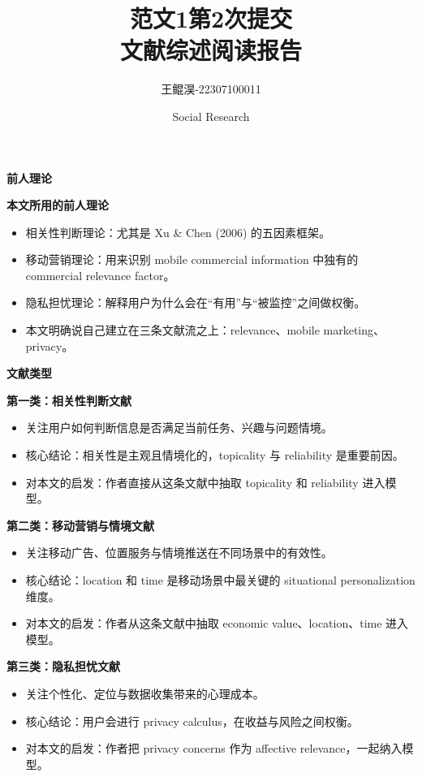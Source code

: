 \documentclass[aspectratio=169,UTF8,zihao=-4]{ctexbeamer}
\title{范文1第2次提交\\文献综述阅读报告}
\author{王鲲淏-22307100011}
\date{Social Research}
\newcommand{\bigidea}[1]{
  \begin{center}
    \vspace{0.8em}
    {\LARGE \bfseries #1}
    \vspace{0.6em}
  \end{center}
}
\newcommand{\sectionpageframe}[1]{
  \begin{frame}[plain]
    \begin{center}
      \vfill
      {\Huge \bfseries #1}
      \vfill
    \end{center}
  \end{frame}
}
\begin{document}
\begin{frame}[plain]
  \titlepage
\end{frame}

\sectionpageframe{前人理论}

\begin{frame}
  \bigidea{本文所用的前人理论}
  \begin{itemize}
    \item \Large 相关性判断理论：尤其是 Xu \& Chen (2006) 的五因素框架。
    \item \Large 移动营销理论：用来识别 mobile commercial information 中独有的 commercial relevance factor。
    \item \Large 隐私担忧理论：解释用户为什么会在“有用”与“被监控”之间做权衡。
    \item \Large 本文明确说自己建立在三条文献流之上：relevance、mobile marketing、privacy。
  \end{itemize}
\end{frame}

\sectionpageframe{文献类型}

\begin{frame}
  \bigidea{第一类：相关性判断文献}
  \begin{itemize}
    \item \Large 关注用户如何判断信息是否满足当前任务、兴趣与问题情境。
    \item \Large 核心结论：相关性是主观且情境化的，topicality 与 reliability 是重要前因。
    \item \Large 对本文的启发：作者直接从这条文献中抽取 topicality 和 reliability 进入模型。
  \end{itemize}
\end{frame}

\begin{frame}
  \bigidea{第二类：移动营销与情境文献}
  \begin{itemize}
    \item \Large 关注移动广告、位置服务与情境推送在不同场景中的有效性。
    \item \Large 核心结论：location 和 time 是移动场景中最关键的 situational personalization 维度。
    \item \Large 对本文的启发：作者从这条文献中抽取 economic value、location、time 进入模型。
  \end{itemize}
\end{frame}

\begin{frame}
  \bigidea{第三类：隐私担忧文献}
  \begin{itemize}
    \item \Large 关注个性化、定位与数据收集带来的心理成本。
    \item \Large 核心结论：用户会进行 privacy calculus，在收益与风险之间权衡。
    \item \Large 对本文的启发：作者把 privacy concerns 作为 affective relevance，一起纳入模型。
  \end{itemize}
\end{frame}
\end{document}
